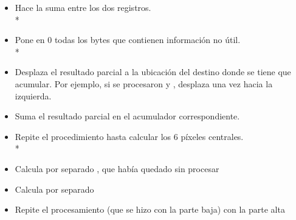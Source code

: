 \begin{itemize}
\item Hace la suma entre los dos registros.\\*


\item Pone en 0 todas los bytes que contienen informaci\'on no \'util. \\*


\item Desplaza el resultado parcial a la ubicaci\'on del destino donde se tiene que acumular. Por ejemplo, si se procesaron  y , desplaza una vez hacia la izquierda. \\

\item Suma el resultado parcial en el acumulador correspondiente. \\

\item Repite el procedimiento hasta calcular los 6 p\'ixeles centrales. \\*


\item Calcula por separado , que hab\'ia quedado sin procesar

\item Calcula por separado 

\item Repite el procesamiento (que se hizo con la parte baja) con la parte alta


\end{itemize}
